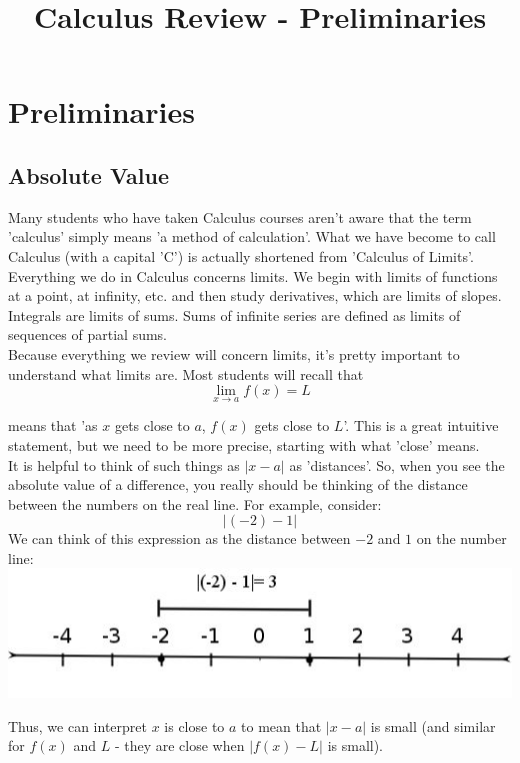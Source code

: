 \documentclass[12pt,a4paper]{article} %
\title{Calculus Review - Preliminaries}
\begin{document}
\maketitle
\section{Preliminaries}
\subsection{Absolute Value}
Many students who have taken Calculus courses aren't aware that the term 'calculus' simply means 'a method of calculation'. What we have become to call Calculus (with a capital 'C') is actually shortened from 'Calculus of Limits'. Everything we do in Calculus concerns limits. We begin with limits of functions at a point, at infinity, etc. and then study derivatives, which are limits of slopes. Integrals are limits of sums. Sums of infinite series are defined as limits of sequences of partial sums.\\

Because everything we review will concern limits, it's pretty important to understand what limits are. Most students will recall that\\

$$\lim\limits_{x\rightarrow a} f(x) = L$$

means that 'as $x$ gets close to $a$, $f(x)$ gets close to $L$'. This is a great intuitive statement, but we need to be more precise, starting with what 'close' means.\\

It is helpful to think of such things as $|x -a|$ as 'distances'.  So, when you see the absolute value of a difference, you really should be thinking of the distance between the numbers on the real line.  For example, consider:
$$|(-2) - 1|$$
We can think of this expression as the distance between $-2$ and $1$ on the number line:\\
\includegraphics[]{dist.jpg}

Thus, we can interpret $x$ is close to $a$ to mean that $|x-a|$ is small (and similar for $f(x)$ and $L$ - they are close when $|f(x) - L|$ is small).\\
\end{document}
